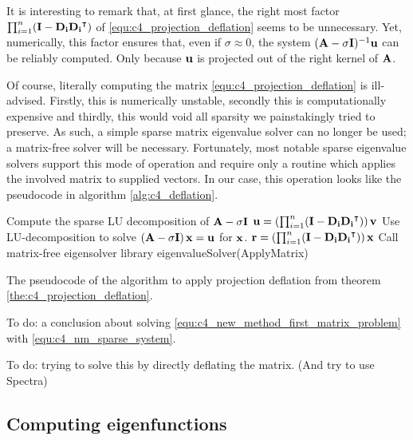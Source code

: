It is interesting to remark that, at first glance, the right most factor $\prod_{i=1}^{n}(\vb{I} - \vb{D_i}{\vb{D_i}}^\intercal)$ of \eqref{equ:c4_projection_deflation} seems to be unnecessary. Yet, numerically, this factor ensures that, even if $\sigma \approx 0$, the system $(\vb{A} - \sigma \vb{I})^{-1} \vb{u}$ can be reliably computed. Only because $\vb{u}$ is projected out of the right kernel of $\vb{A}$.

Of course, literally computing the matrix \eqref{equ:c4_projection_deflation} is ill-advised. Firstly, this is numerically unstable, secondly this is computationally expensive and thirdly, this would void all sparsity we painstakingly tried to preserve. As such, a simple sparse matrix eigenvalue solver can no longer be used; a matrix-free solver will be necessary. Fortunately, most notable sparse eigenvalue solvers \cite{hernandez_slepc_2005,lehoucq_arpack_1998,qiu_yixuan_2022} support this mode of operation and require only a routine which applies the involved matrix to supplied vectors. In our case, this operation looks like the pseudocode in algorithm \ref{alg:c4_deflation}.

\begin{algorithm}
    \begin{algorithmic}
        \State Compute the sparse LU decomposition of $\vb{A} - \sigma \vb{I}$
        \State
        \State $\vb{u} = \left(\prod_{i=1}^{n}(\vb{I} - \vb{D_i}{\vb{D_i}}^\intercal)\right) \vb{v}$
        \State Use LU-decomposition to solve $\left(\vb{A} - \sigma \vb{I}\right) \vb{x} = \vb{u}$ for $\vb{x}$.
        \State $\vb{r} = \left(\prod_{i=1}^{n}(\vb{I} - \vb{D_i}{\vb{D_i}}^\intercal)\right) \vb{x}$
        \EndFunction
        \State
        \Statex \Comment Call matrix-free eigensolver library
        \State eigenvalueSolver(ApplyMatrix)
    \end{algorithmic}
    \caption{The pseudocode of the algorithm to apply projection deflation from theorem \ref{the:c4_projection_deflation}.}\label{alg:c4_deflation}
\end{algorithm}

{\color{red}To do: a conclusion about solving \eqref{equ:c4_new_method_first_matrix_problem} with \eqref{equ:c4_nm_sparse_system}.}

{\color{red}To do: trying to solve this by directly deflating the matrix. (And try to use Spectra)}

\subsection{Computing eigenfunctions}

